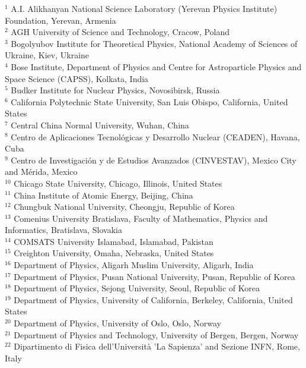 \begin{flushleft}
$^{1}$ A.I. Alikhanyan National Science Laboratory (Yerevan Physics Institute) Foundation, Yerevan, Armenia\\
$^{2}$ AGH University of Science and Technology, Cracow, Poland\\
$^{3}$ Bogolyubov Institute for Theoretical Physics, National Academy of Sciences of Ukraine, Kiev, Ukraine\\
$^{4}$ Bose Institute, Department of Physics  and Centre for Astroparticle Physics and Space Science (CAPSS), Kolkata, India\\
$^{5}$ Budker Institute for Nuclear Physics, Novosibirsk, Russia\\
$^{6}$ California Polytechnic State University, San Luis Obispo, California, United States\\
$^{7}$ Central China Normal University, Wuhan, China\\
$^{8}$ Centro de Aplicaciones Tecnol\'{o}gicas y Desarrollo Nuclear (CEADEN), Havana, Cuba\\
$^{9}$ Centro de Investigaci\'{o}n y de Estudios Avanzados (CINVESTAV), Mexico City and M\'{e}rida, Mexico\\
$^{10}$ Chicago State University, Chicago, Illinois, United States\\
$^{11}$ China Institute of Atomic Energy, Beijing, China\\
$^{12}$ Chungbuk National University, Cheongju, Republic of Korea\\
$^{13}$ Comenius University Bratislava, Faculty of Mathematics, Physics and Informatics, Bratislava, Slovakia\\
$^{14}$ COMSATS University Islamabad, Islamabad, Pakistan\\
$^{15}$ Creighton University, Omaha, Nebraska, United States\\
$^{16}$ Department of Physics, Aligarh Muslim University, Aligarh, India\\
$^{17}$ Department of Physics, Pusan National University, Pusan, Republic of Korea\\
$^{18}$ Department of Physics, Sejong University, Seoul, Republic of Korea\\
$^{19}$ Department of Physics, University of California, Berkeley, California, United States\\
$^{20}$ Department of Physics, University of Oslo, Oslo, Norway\\
$^{21}$ Department of Physics and Technology, University of Bergen, Bergen, Norway\\
$^{22}$ Dipartimento di Fisica dell'Universit\`{a} 'La Sapienza' and Sezione INFN, Rome, Italy\\

\end{flushleft}
